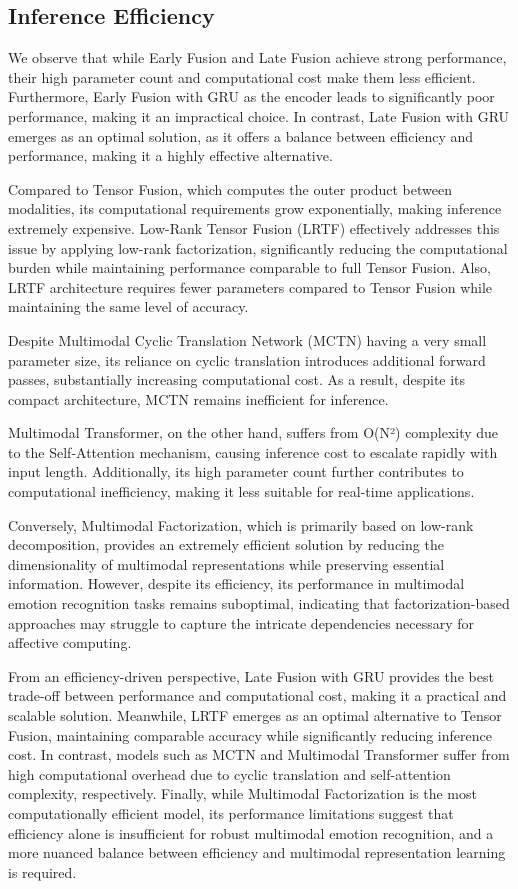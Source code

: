 \documentclass{article}
\begin{document}
\subsection{Inference Efficiency}
We observe that while Early Fusion and Late Fusion achieve strong performance, their high parameter count and computational cost make them less efficient. Furthermore, Early Fusion with GRU as the encoder leads to significantly poor performance, making it an impractical choice. In contrast, Late Fusion with GRU emerges as an optimal solution, as it offers a balance between efficiency and performance, making it a highly effective alternative.

Compared to Tensor Fusion, which computes the outer product between modalities, its computational requirements grow exponentially, making inference extremely expensive. Low-Rank Tensor Fusion (LRTF) effectively addresses this issue by applying low-rank factorization, significantly reducing the computational burden while maintaining performance comparable to full Tensor Fusion. Also, LRTF architecture requires fewer parameters compared to Tensor Fusion while maintaining the same level of accuracy.

\newpage
Despite Multimodal Cyclic Translation Network (MCTN) having a very small parameter size, its reliance on cyclic translation introduces additional forward passes, substantially increasing computational cost. As a result, despite its compact architecture, MCTN remains inefficient for inference.

Multimodal Transformer, on the other hand, suffers from O(N²) complexity due to the Self-Attention mechanism, causing inference cost to escalate rapidly with input length. Additionally, its high parameter count further contributes to computational inefficiency, making it less suitable for real-time applications.

Conversely, Multimodal Factorization, which is primarily based on low-rank decomposition, provides an extremely efficient solution by reducing the dimensionality of multimodal representations while preserving essential information. However, despite its efficiency, its performance in multimodal emotion recognition tasks remains suboptimal, indicating that factorization-based approaches may struggle to capture the intricate dependencies necessary for affective computing.

From an efficiency-driven perspective, Late Fusion with GRU provides the best trade-off between performance and computational cost, making it a practical and scalable solution. Meanwhile, LRTF emerges as an optimal alternative to Tensor Fusion, maintaining comparable accuracy while significantly reducing inference cost. In contrast, models such as MCTN and Multimodal Transformer suffer from high computational overhead due to cyclic translation and self-attention complexity, respectively. Finally, while Multimodal Factorization is the most computationally efficient model, its performance limitations suggest that efficiency alone is insufficient for robust multimodal emotion recognition, and a more nuanced balance between efficiency and multimodal representation learning is required.
\end{document}

